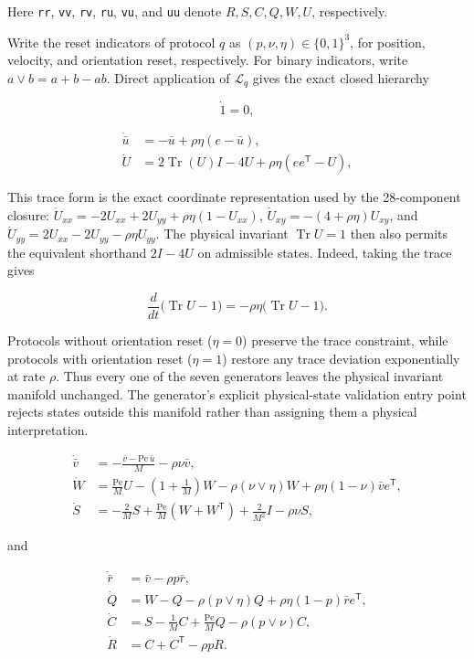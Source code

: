 Here \texttt{rr}, \texttt{vv}, \texttt{rv}, \texttt{ru}, \texttt{vu}, and \texttt{uu} denote \(R,S,C,Q,W,U\), respectively.

Write the reset indicators of protocol \(q\) as \((p,\nu,\eta)\in\{0,1\}^3\), for position, velocity, and orientation reset, respectively. For binary indicators, write \(a\vee b=a+b-ab\). Direct application of \(\mathcal L_q\) gives the exact closed hierarchy

\[
\dot 1=0,
\]

\[
\begin{aligned}
\dot{\bar u}
&=-\bar u+\rho\eta(e-\bar u),\\
\dot U
&=2\operatorname{Tr}(U)I-4U+\rho\eta(ee^\mathsf T-U),
\end{aligned}
\]

This trace form is the exact coordinate representation used by the 28-component closure: \(\dot U_{xx}=-2U_{xx}+2U_{yy}+\rho\eta(1-U_{xx})\), \(\dot U_{xy}=-(4+\rho\eta)U_{xy}\), and \(\dot U_{yy}=2U_{xx}-2U_{yy}-\rho\eta U_{yy}\). The physical invariant \(\operatorname{Tr}U=1\) then also permits the equivalent shorthand \(2I-4U\) on admissible states. Indeed, taking the trace gives

\[
\frac{d}{dt}\big(\operatorname{Tr}U-1\big)
=-\rho\eta\big(\operatorname{Tr}U-1\big).
\]

Protocols without orientation reset (\(\eta=0\)) preserve the trace constraint, while protocols with orientation reset (\(\eta=1\)) restore any trace deviation exponentially at rate \(\rho\). Thus every one of the seven generators leaves the physical invariant manifold unchanged. The generator's explicit physical-state validation entry point rejects states outside this manifold rather than assigning them a physical interpretation.

\[
\begin{aligned}
\dot{\bar v}
&=-\frac{\bar v-\mathrm{Pe}\,\bar u}{M}-\rho\nu\bar v,\\
\dot W
&=\frac{\mathrm{Pe}}{M}U-\left(1+\frac1M\right)W
-\rho(\nu\vee\eta)W
+\rho\eta(1-\nu)\bar v e^\mathsf T,\\
\dot S
&=-\frac{2}{M}S+\frac{\mathrm{Pe}}{M}(W+W^\mathsf T)
+\frac{2}{M^2}I-\rho\nu S,
\end{aligned}
\]

and

\[
\begin{aligned}
\dot{\bar r}
&=\bar v-\rho p\bar r,\\
\dot Q
&=W-Q-\rho(p\vee\eta)Q
+\rho\eta(1-p)\bar r e^\mathsf T,\\
\dot C
&=S-\frac1M C+\frac{\mathrm{Pe}}{M}Q
-\rho(p\vee\nu)C,\\
\dot R
&=C+C^\mathsf T-\rho pR.
\end{aligned}
\]

